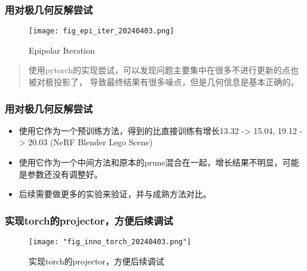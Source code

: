 \documentclass{njupre/njupre}
\begin{document}
\begin{frame}
    \frametitle{用对极几何反解尝试}
    \begin{figure}
        \texttt{[image: fig\_epi\_iter\_20240403.png]}
        \caption{Epipolar Iteration}
    \end{figure}
    \begin{quote}
        使用pytorch的实现尝试，可以发现问题主要集中在很多不进行更新的点也被对极投影了，
        导致最终结果有很多噪点，但是几何信息是基本正确的。
    \end{quote}
\end{frame}


\begin{frame}
    \frametitle{用对极几何反解尝试}
    \begin{itemize}
        \item 使用它作为一个预训练方法，得到的比直接训练有增长13.32 -> 15.04, 19.12 -> 20.03 (NeRF Blender Lego Scene)
        \item 使用它作为一个中间方法和原本的prune混合在一起，增长结果不明显，可能是参数还没有调整好。
        \item 后续需要做更多的实验来验证，并与成熟方法对比。
    \end{itemize}
\end{frame}


\begin{frame}
    \frametitle{实现torch的projector，方便后续调试}
    \begin{figure}
        \texttt{[image: "fig\_inno\_torch\_20240403.png"]}
        \caption{实现torch的projector，方便后续调试}
    \end{figure}
\end{frame}
\end{document}

